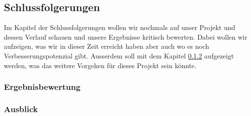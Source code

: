 \subsection{Schlussfolgerungen}
Im Kapitel der Schlussfolgerungen wollen wir nochmals auf unser Projekt und dessen Verlauf schauen und unsere Ergebnisse kritisch bewerten. Dabei wollen wir aufzeigen, was wir in dieser Zeit erreicht haben aber auch wo es noch Verbesserungspotenzial gibt. Ausserdem soll mit dem Kapitel \ref{subsub:Ausblick} aufgezeigt werden, was das weitere Vorgehen für dieses Projekt sein könnte.

\subsubsection{Ergebnisbewertung}

\subsubsection{Ausblick}
\label{subsub:Ausblick}



